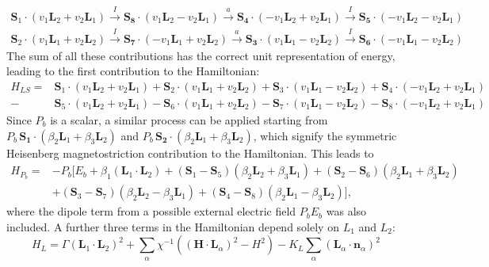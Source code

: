 \begin{align}
	\mathbf{S}_1\cdot(v_1 \mathbf{L}_2 + v_2 \mathbf{L}_1) \xrightarrow{I} \mathbf{S_8}\cdot(v_1 \mathbf{L}_2 - v_2 \mathbf{L}_1) \xrightarrow{a} \mathbf{S_4} \cdot (- v_1 \mathbf{L}_2 + v_2 \mathbf{L}_1) \xrightarrow{I} \mathbf{S_5} \cdot (-v_1 \mathbf{L}_2 - v_2 \mathbf{L}_1) \nonumber\\
	\mathbf{S}_2\cdot(v_1 \mathbf{L}_1 + v_2 \mathbf{L}_2) \xrightarrow{I} \mathbf{S_7}\cdot(-v_1 \mathbf{L}_1 + v_2 \mathbf{L}_2) \xrightarrow{a} \mathbf{S_3} \cdot (v_1 \mathbf{L}_1 - v_2 \mathbf{L}_2) \xrightarrow{I} \mathbf{S_6} \cdot (-v_1 \mathbf{L}_1 - v_2 \mathbf{L}_2) 
\end{align}
The sum of all these contributions has the correct unit representation of energy, leading to the first contribution to the Hamiltonian:
\begin{align}
    H_{LS} =& \mathbf{S}_1 \cdot (v_1 \mathbf{L}_2 + v_2 \mathbf{L}_1) + \mathbf{S}_2 \cdot (v_1 \mathbf{L}_1 + v_2 \mathbf{L}_2) + \mathbf{S}_3 \cdot (v_1 \mathbf{L}_1 - v_2 \mathbf{L}_2) + \mathbf{S}_4 \cdot (-v_1 \mathbf{L}_2 + v_2 \mathbf{L}_1) \nonumber\\
    -&\mathbf{S}_5 \cdot (v_1 \mathbf{L}_2 + v_2 \mathbf{L}_1) - \mathbf{S}_6 \cdot (v_1 \mathbf{L}_1 + v_2 \mathbf{L}_2) - \mathbf{S}_7 \cdot (v_1 \mathbf{L}_1 - v_2 \mathbf{L}_2) - \mathbf{S}_8 \cdot (-v_1 \mathbf{L}_2 + v_2 \mathbf{L}_1)
\end{align}
Since $P_b$ is a scalar, a similar process can be applied starting from $P_b \, \mathbf{S_1}\cdot(\beta_2 \mathbf{L}_1 + \beta_3 \mathbf{L}_2)$ and $P_b\, \mathbf{S_2}\cdot(\beta_2 \mathbf{L}_1 + \beta_3 \mathbf{L}_2)$, which signify the symmetric Heisenberg magnetostriction contribution to the Hamiltonian. This leads to
\begin{align}
	H_{P_b}=&-P_b[E_b + \beta_1 (\mathbf{L}_1\cdot \mathbf{L}_2)+
    (\mathbf{S}_1-\mathbf{S}_5)(\beta_2 \mathbf{L}_2 + \beta_3 \mathbf{L}_1) +
    (\mathbf{S}_2-\mathbf{S}_6)(\beta_2 \mathbf{L}_1 + \beta_3 \mathbf{L}_2) \nonumber\\ 
    &+(\mathbf{S}_3-\mathbf{S}_7)(\beta_2 \mathbf{L}_2 - \beta_3 \mathbf{L}_1) +
    (\mathbf{S}_4-\mathbf{S}_8)(\beta_2 \mathbf{L}_1 - \beta_3 \mathbf{L}_2)],
\end{align}
where the dipole term from a possible external electric field $P_b E_b$ was also included. 
A further three terms in the Hamiltonian depend solely on $L_1$ and $L_2$:
\begin{equation}
	H_L = \Gamma(\mathbf{L}_1\cdot \mathbf{L}_2)^2
    +\sum_{\alpha}\chi^{-1}((\mathbf{H}\cdot \mathbf{L}_\alpha)^2-H^2)
    -K_L\sum_\alpha(\mathbf{L}_\alpha\cdot \mathbf{n}_\alpha)^2\label{eq:GdMn2O5_hami_1}
\end{equation}
